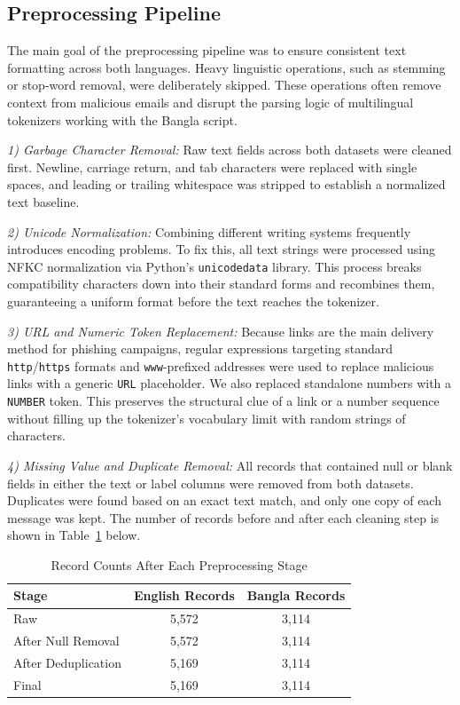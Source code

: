 \documentclass[journal]{IEEEtran}
\begin{document}
\subsection{Preprocessing Pipeline}

The main goal of the preprocessing pipeline was to ensure consistent text formatting across both languages. Heavy linguistic operations, such as stemming or stop-word removal, were deliberately skipped. These operations often remove context from malicious emails and disrupt the parsing logic of multilingual tokenizers working with the Bangla script.

\textit{1) Garbage Character Removal:} Raw text fields across both datasets were cleaned first. Newline, carriage return, and tab characters were replaced with single spaces, and leading or trailing whitespace was stripped to establish a normalized text baseline.

\textit{2) Unicode Normalization:} Combining different writing systems frequently introduces encoding problems. To fix this, all text strings were processed using NFKC normalization via Python's \texttt{unicodedata} library. This process breaks compatibility characters down into their standard forms and recombines them, guaranteeing a uniform format before the text reaches the tokenizer.

\textit{3) URL and Numeric Token Replacement:} Because links are the main delivery method for phishing campaigns, regular expressions targeting standard \texttt{http}/\texttt{https} formats and \texttt{www}-prefixed addresses were used to replace malicious links with a generic \texttt{URL} placeholder. We also replaced standalone numbers with a \texttt{NUMBER} token. This preserves the structural clue of a link or a number sequence without filling up the tokenizer's vocabulary limit with random strings of characters.

\textit{4) Missing Value and Duplicate Removal:} All records that contained null or blank fields in either the text or label columns were removed from both datasets. Duplicates were found based on an exact text match, and only one copy of each message was kept. The number of records before and after each cleaning step is shown in Table~\ref{tab:dataset_prep} below.

\begin{table}[htbp]
\caption{Record Counts After Each Preprocessing Stage}
\label{tab:dataset_prep}
\centering
\begin{tabular}{lcc}
\toprule
\textbf{Stage} & \textbf{English Records} & \textbf{Bangla Records} \\
\midrule
Raw & 5,572 & 3,114 \\
After Null Removal & 5,572 & 3,114 \\
After Deduplication & 5,169 & 3,114 \\
Final & 5,169 & 3,114 \\
\bottomrule
\end{tabular}
\end{table}
\end{document}
